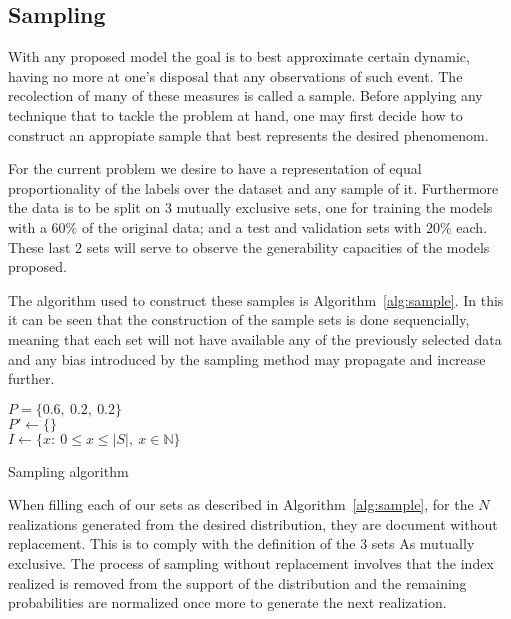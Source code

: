 \documentclass[journal]{IEEEtran}
\begin{document}
\subsection{Sampling\label{sec:sample}}

With any proposed model the goal is to best approximate certain dynamic, having
no more at one's disposal that any observations of such event. The recolection
of many of these measures is called a sample. Before applying any technique that
to tackle the problem at hand, one may first decide how to construct an
appropiate sample that best represents the desired phenomenom.

For the current problem we desire to have a representation of equal
proportionality of the labels over the dataset and any sample of it. Furthermore
the data is to be split on $3$ mutually exclusive sets, one for training the
models with a $60\%$ of the original data; and a test and validation sets with
$20\%$ each. These last $2$ sets will serve to observe the generability
capacities of the models proposed.

The algorithm used to construct these samples is Algorithm~\ref{alg:sample}. In
this it can be seen that the construction of the sample sets is done
sequencially, meaning that each set will not have available any of the
previously selected data and any bias introduced by the sampling method may
propagate and increase further.

\begin{algorithm}[ht]
    $P = \{0.6,\ 0.2,\ 0.2\}$\\
    $P' \gets \{\}$\\
    $I \gets \{x:\ 0\leq x\leq \lvert S\rvert,\ x\in\mathbb{N}\}$\\
     \caption{Sampling algorithm\label{alg:sample}}
\end{algorithm}

When filling each of our sets as described in Algorithm~\ref{alg:sample}, for
the $N$ realizations generated from the desired distribution, they are document
without replacement. This is to comply with the definition of the $3$ sets As
mutually exclusive. The process of sampling without replacement involves that
the index realized is removed from the support of the distribution and the
remaining probabilities are normalized once more to generate the next
realization.
\end{document}
